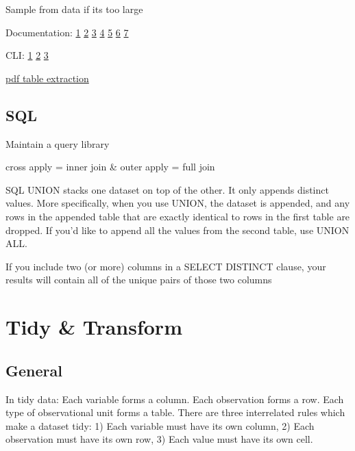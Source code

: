 \documentclass[]{book}
\begin{document}
Sample from data if its too large

Documentation: \href{http://databasenotetaker.com/}{1} \textbar{} \href{https://dataedo.com/}{2} \textbar{} \href{https://www.apexsql.com/sql-tools-doc.aspx}{3} \textbar{} \href{https://techwriter.me/best-practices-guide/documenting-databases.aspx}{4} \textbar{} \href{http://help.osf.io/m/bestpractices/l/618767-how-to-make-a-data-dictionary}{5} \textbar{} \href{https://dataedo.com/blog/different-types-of-tools-you-can-use-to-document-your-database}{6} \textbar{} \href{https://drawsql.app/\#features}{7}

CLI: \href{http://bconnelly.net/working-with-csvs-on-the-command-line/\#taking-a-peek-at-the-data-set}{1} \textbar{} \href{https://opensource.com/article/17/2/command-line-tools-data-analysis-linux?sc_cid=701600000011jJVAAY}{2} \textbar{} \href{http://alexisperrier.com/shell/2017/11/07/command-line-data-scientist.html}{3}

\href{https://tabula.technology}{pdf table extraction}

\hypertarget{sql}{%
\subsection{SQL}\label{sql}}

Maintain a query library

cross apply = inner join \& outer apply = full join

SQL UNION stacks one dataset on top of the other. It only appends distinct values. More specifically, when you use UNION, the dataset is appended, and any rows in the appended table that are exactly identical to rows in the first table are dropped. If you'd like to append all the values from the second table, use UNION ALL.

If you include two (or more) columns in a SELECT DISTINCT clause, your results will contain all of the unique pairs of those two columns

\hypertarget{tidy-transform}{%
\section{Tidy \& Transform}\label{tidy-transform}}

\hypertarget{general-1}{%
\subsection{General}\label{general-1}}

In tidy data: Each variable forms a column. Each observation forms a row. Each type of observational unit forms a table. There are three interrelated rules which make a dataset tidy: 1) Each variable must have its own column, 2) Each observation must have its own row, 3) Each value must have its own cell.
\end{document}
